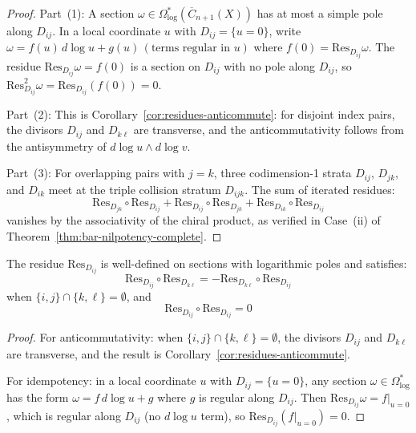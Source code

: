    \begin{proof}
   Part~(1): A section $\omega \in \Omega^*_{\log}(\overline{C}_{n+1}(X))$ has at most a simple pole along $D_{ij}$.  In a local coordinate $u$ with $D_{ij} = \{u = 0\}$, write
   $\omega = f(u)\,d\log u + g(u)\,(\text{terms regular in }u)$
   where $f(0) = \mathrm{Res}_{D_{ij}}\omega$.  The residue $\mathrm{Res}_{D_{ij}}\omega = f(0)$ is a section on $D_{ij}$ with no pole along $D_{ij}$, so $\mathrm{Res}_{D_{ij}}^2\omega = \mathrm{Res}_{D_{ij}}(f(0)) = 0$.

   Part~(2): This is Corollary~\ref{cor:residues-anticommute}: for disjoint index pairs, the divisors $D_{ij}$ and $D_{k\ell}$ are transverse, and the anticommutativity follows from the antisymmetry of $d\log u \wedge d\log v$.

   Part~(3): For overlapping pairs with $j = k$, three codimension-1 strata $D_{ij}$, $D_{jk}$, and $D_{ik}$ meet at the triple collision stratum $D_{ijk}$.  The sum of iterated residues:
   \[
   \mathrm{Res}_{D_{jk}} \circ \mathrm{Res}_{D_{ij}} + \mathrm{Res}_{D_{ij}} \circ \mathrm{Res}_{D_{jk}} + \mathrm{Res}_{D_{ik}} \circ \mathrm{Res}_{D_{ij}}
   \]
   vanishes by the associativity of the chiral product, as verified in Case~(ii) of Theorem~\ref{thm:bar-nilpotency-complete}.
   \end{proof}
 
\begin{lemma}
\label{lem:residue-well-defined}
The residue $\text{Res}_{D_{ij}}$ is well-defined on sections with logarithmic poles and satisfies:
\[
\text{Res}_{D_{ij}} \circ \text{Res}_{D_{k\ell}} = -\text{Res}_{D_{k\ell}} \circ \text{Res}_{D_{ij}}
\]
when $\{i,j\} \cap \{k,\ell\} = \emptyset$, and
\[
\text{Res}_{D_{ij}} \circ \text{Res}_{D_{ij}} = 0
\]
\end{lemma}
 
\begin{proof}
For anticommutativity: when $\{i,j\} \cap \{k,\ell\} = \emptyset$, the divisors $D_{ij}$ and $D_{k\ell}$ are transverse, and the result is Corollary~\ref{cor:residues-anticommute}.

For idempotency: in a local coordinate $u$ with $D_{ij} = \{u = 0\}$, any section $\omega \in \Omega^*_{\log}$ has the form $\omega = f\,d\log u + g$ where $g$ is regular along $D_{ij}$.  Then $\mathrm{Res}_{D_{ij}}\omega = f|_{u=0}$, which is regular along $D_{ij}$ (no $d\log u$ term), so $\mathrm{Res}_{D_{ij}}(f|_{u=0}) = 0$.
\end{proof}
 
